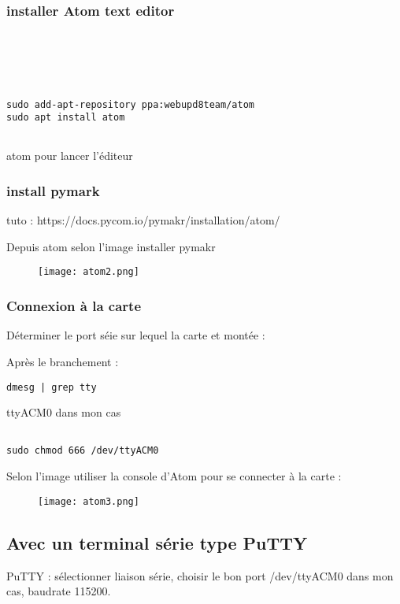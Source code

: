 \documentclass{article}
\begin{document}
\subsubsection{installer Atom text editor}

\begin{verbatim}





sudo add-apt-repository ppa:webupd8team/atom
sudo apt install atom


\end{verbatim}
atom pour lancer l'éditeur

\subsubsection{install pymark}
tuto : https://docs.pycom.io/pymakr/installation/atom/

Depuis atom selon l'image installer pymakr


    \begin{figure}[H]
\begin{center}
\advance\leftskip-3cm
\advance\rightskip-3cm
\texttt{[image: atom2.png]}
\label{visina8}
\end{center}\end{figure}

\subsubsection{Connexion à la carte}

Déterminer le port séie sur lequel la carte et montée :

Après le branchement : 

\begin{verbatim}
dmesg | grep tty 
\end{verbatim}

ttyACM0 dans mon cas

\begin{verbatim}

sudo chmod 666 /dev/ttyACM0

\end{verbatim}
Selon l'image utiliser la console d'Atom pour se connecter à la carte :

  \begin{figure}[H]
\begin{center}
\advance\leftskip-3cm
\advance\rightskip-3cm
\texttt{[image: atom3.png]}
\label{visina8}
\end{center}\end{figure}

\subsection{Avec un terminal série type PuTTY}

PuTTY : sélectionner liaison série, choisir le bon port /dev/ttyACM0 dans mon cas, baudrate 115200.
\end{document}
